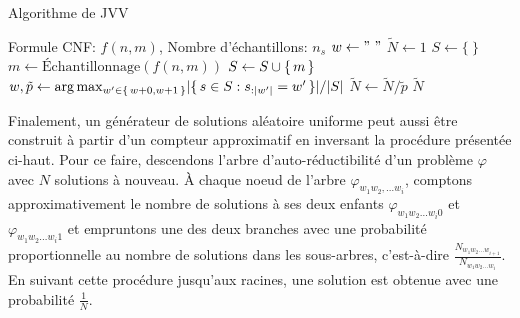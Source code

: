 \begin{algorithm}[H]
    \caption{Algorithme de JVV}\label{alg:algorithme-jvv}
    \begin{algorithmic}[1]
    \REQUIRE Formule CNF: $f(n, m)$, Nombre d'échantillons: $n_{s}$
    \STATE $w \leftarrow " \ "$
    \STATE $\tilde{N} \leftarrow 1$
    \STATE $S \leftarrow \{ \ \}$
    \STATE $m \leftarrow \text{Échantillonnage}(f(n,m))$
    \STATE $S \leftarrow S \cup \set{m}$
    \ENDWHILE
    \STATE $w, \tilde{p} \leftarrow \arg \max_{w' \in \set{ w + 0, w + 1 }} \lvert \set{ s \in S : s_{:\lvert w' \rvert } = w' } \rvert / \lvert S \rvert$
    \STATE $\tilde{N} \leftarrow \tilde{N} / \tilde{p}$
    \ENDFOR
    \RETURN $\tilde{N}$
\end{algorithmic}
\end{algorithm}

Finalement, un générateur de solutions aléatoire uniforme peut aussi être construit à partir d'un compteur approximatif en inversant la procédure présentée ci-haut. Pour ce faire, descendons l'arbre d'auto-réductibilité d'un problème $\varphi$ avec $N$ solutions à nouveau. À chaque noeud de l'arbre $\varphi_{w_{1} w_{2}, \dots w_{i}}$, comptons approximativement le nombre de solutions à ses deux enfants $\varphi_{w_{1} w_{2} \dots w_{i} 0}$ et $\varphi_{w_{1} w_{2} \dots w_{i} 1}$ et empruntons une des deux branches avec une probabilité proportionnelle au nombre de solutions dans les sous-arbres, c'est-à-dire $\frac{N_{w_{1} w_{2} \dots w_{i+1}}}{N_{w_{1} w_{2} \dots w_{i}}}$. En suivant cette procédure jusqu'aux racines, une solution est obtenue avec une probabilité $\frac{1}{N}$.